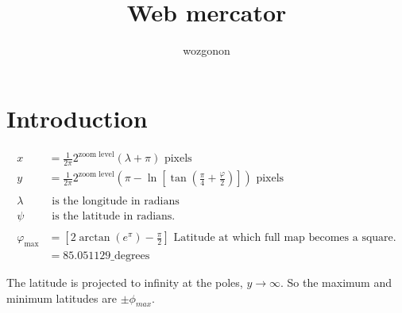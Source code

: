 \documentclass[11pt]{article} %
\title{Web mercator}
\author{wozgonon}
\date{} %
\begin{document}
\maketitle

\section{Introduction}



\begin{align*}
  x &= \frac{1}{2\pi} 2^{\text{zoom level}} (\lambda + \pi) \text{\ pixels} \\
  y &= \frac{1}{2\pi} 2^{\text{zoom level}} \left(\pi - \ln \left[\tan \left(\frac{\pi}{4} + \frac{\varphi}{2} \right) \right]\right) \text{\ pixels} \\
\\
\lambda & \text{\ is the longitude in radians} \\
\psi & \text{\ is the latitude in radians.} \\
\\
\varphi_{\text{max}} &= \left[2\arctan(e^{\pi}) - \frac{\pi}{2}\right]    \text{\ Latitude at which full map becomes a square.} \\
&= 85.051129 \text{\_degrees}
\end{align*}

The latitude is projected to infinity at the poles, $y\to\infty$.
So the maximum and minimum latitudes are $\pm\phi_{max}$.
\end{document}
